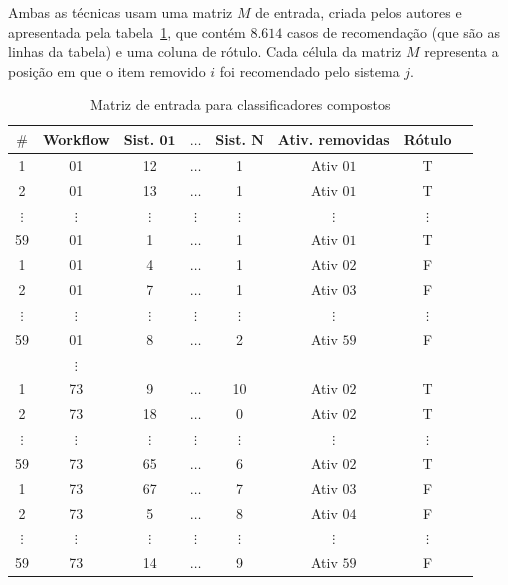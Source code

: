 Ambas as técnicas usam uma matriz \(M\) de entrada, criada pelos autores e apresentada pela tabela~\ref{tabela_matriz_de_dados_classificador_composto}, que contém \(8.614\) casos de recomendação (que são as linhas da tabela) e uma coluna de rótulo. Cada célula da matriz \(M\) representa a posição em que o item removido \(i\) foi recomendado pelo sistema \(j\).
\begin{table}[!htb]
	\tiny
	\centering
	\caption{Matriz de entrada para classificadores compostos}
	\begin{tabular}{|c|c|c|c|c|c|c|c|}  \hline
	
\textbf{$\mathbf{\#}$} & \textbf{Workflow} & \textbf{Sist. $\mathbf{01}$}  & \textbf{$\ldots$}  & \textbf{Sist. $\mathbf{N}$} & \textbf{Ativ. removidas} & \textbf{Rótulo} \\ \hline

1			& 01		  & 12 		   &\(\ldots\) & 1 		   & Ativ $01$ 	& T			\\ \hline
2			& 01 		  & 13 		   &\(\ldots\) & 1         & Ativ $01$ 	& T			\\ \hline
\(\vdots\)  &\(\vdots\)   &\(\vdots\)  &\(\vdots\) &\(\vdots\) &\(\vdots\)  &\(\vdots\) \\ \hline
59			& 01 		  & 1 		   &\(\ldots\) & 1         & Ativ $01$ 	& T			\\ \hline
1			& 01		  & 4 		   &\(\ldots\) & 1         & Ativ $02$	& F			\\ \hline
2			& 01 		  & 7  		   &\(\ldots\) & 1         & Ativ $03$	& F			\\ \hline
\(\vdots\)  &\(\vdots\)   &\(\vdots\)  &\(\vdots\) &\(\vdots\) &\(\vdots\)  &\(\vdots\) \\ \hline
59			& 01 		  & 8          &\(\ldots\) & 2         & Ativ $59$ 	& F 		\\ \hline
			&\(\vdots\)   & 		   & 		   & 		   & 			& 			\\ \hline
1			& 73		  & 9 		   &\(\ldots\) & 10        & Ativ $02$ 	& T			\\ \hline
2			& 73 		  & 18 		   &\(\ldots\) & 0         & Ativ $02$ 	& T			\\ \hline
\(\vdots\)  &\(\vdots\)   &\(\vdots\)  &\(\vdots\) &\(\vdots\) &\(\vdots\)  &\(\vdots\) \\ \hline
59			& 73 		  & 65		   &\(\ldots\) & 6         & Ativ $02$ 	& T			\\ \hline
1			& 73		  & 67 		   &\(\ldots\) & 7         & Ativ $03$ 	& F			\\ \hline
2			& 73 		  & 5 		   &\(\ldots\) & 8 		   & Ativ $04$ 	& F			\\ \hline
\(\vdots\)  &\(\vdots\)   &\(\vdots\)  &\(\vdots\) &\(\vdots\) &\(\vdots\)	&\(\vdots\) \\ \hline
59			& 73          & 14 	       &\(\ldots\) & 9 		   & Ativ $59$ 	& F			\\ \hline
		\end{tabular}
	\label{tabela_matriz_de_dados_classificador_composto}
	\vspace{0.1cm}
	\source{\varAutorData}
\end{table}


